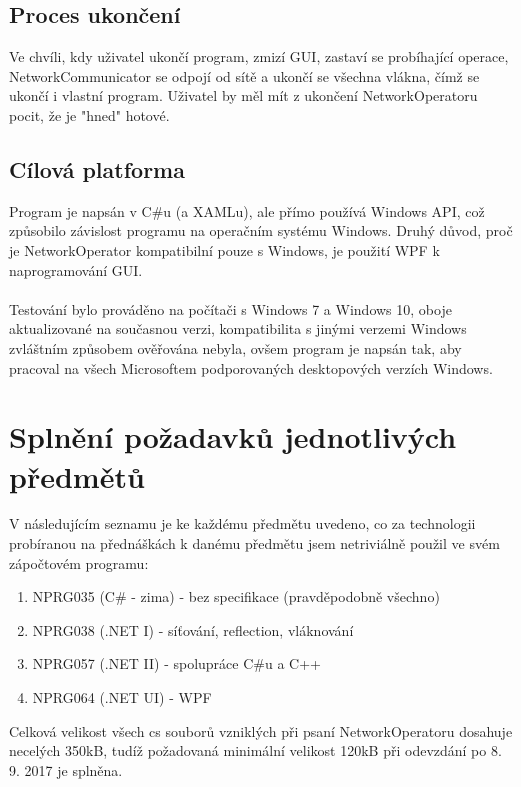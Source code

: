 \documentclass[12pt]{article}
\begin{document}
\subsection{Proces ukončení}
Ve chvíli, kdy uživatel ukončí program, zmizí GUI, zastaví se probíhající operace, NetworkCommunicator se odpojí od sítě a ukončí se všechna vlákna, čímž se ukončí i vlastní program. Uživatel by měl mít z ukončení NetworkOperatoru pocit, že je "hned" hotové.

\subsection{Cílová platforma}
Program je napsán v C\#u (a XAMLu), ale přímo používá Windows API, což způsobilo závislost programu na operačním systému Windows. Druhý důvod, proč je NetworkOperator kompatibilní pouze s Windows, je použití WPF k naprogramování GUI.\\\\
Testování bylo prováděno na počítači s Windows 7 a Windows 10, oboje aktualizované na současnou verzi, kompatibilita s jinými verzemi Windows zvláštním způsobem ověřována nebyla, ovšem program je napsán tak, aby pracoval na všech Microsoftem podporovaných desktopových verzích Windows.

\section{Splnění požadavků jednotlivých předmětů}
V následujícím seznamu je ke každému předmětu uvedeno, co za technologii probíranou na přednáškách k danému předmětu jsem netriviálně použil ve svém zápočtovém programu:
\begin{enumerate}[leftmargin=5mm]
\item NPRG035 (C\# - zima) - bez specifikace (pravděpodobně všechno)
\item NPRG038 (.NET I) - síťování, reflection, vláknování
\item NPRG057 (.NET II) - spolupráce C\#u a C++
\item NPRG064 (.NET UI) - WPF
\end{enumerate}

Celková velikost všech cs souborů vzniklých při psaní NetworkOperatoru dosahuje necelých 350kB, tudíž požadovaná minimální velikost 120kB při odevzdání po 8. 9. 2017 je splněna.
\end{document}
